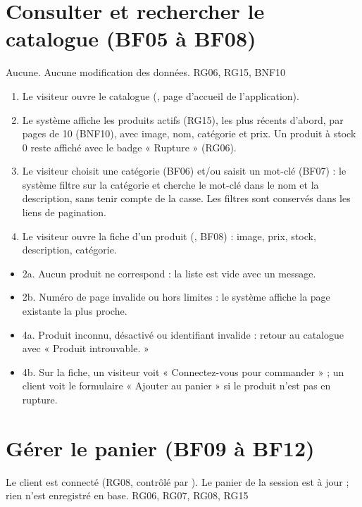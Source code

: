 \section{Consulter et rechercher le catalogue (BF05 à BF08)}

  {Aucune.}
  {Aucune modification des données.}
  {RG06, RG15, BNF10}

\begin{enumerate}
  \item Le visiteur ouvre le catalogue (, page d'accueil de l'application).
  \item Le système affiche les produits actifs (RG15), les plus récents d'abord, par pages de 10 (BNF10), avec
        image, nom, catégorie et prix. Un produit à stock 0 reste affiché avec le badge « Rupture » (RG06).
  \item Le visiteur choisit une catégorie (BF06) et/ou saisit un mot-clé (BF07) : le système filtre sur la
        catégorie et cherche le mot-clé dans le nom et la description, sans tenir compte de la casse. Les filtres
        sont conservés dans les liens de pagination.
  \item Le visiteur ouvre la fiche d'un produit (, BF08) : image, prix, stock, description,
        catégorie.
\end{enumerate}

\begin{itemize}
  \item 2a. Aucun produit ne correspond : la liste est vide avec un message.
  \item 2b. Numéro de page invalide ou hors limites : le système affiche la page existante la plus proche.
  \item 4a. Produit inconnu, désactivé ou identifiant invalide : retour au catalogue avec « Produit introuvable. »
  \item 4b. Sur la fiche, un visiteur voit « Connectez-vous pour commander » ; un client voit le formulaire
        « Ajouter au panier » si le produit n'est pas en rupture.
\end{itemize}

\section{Gérer le panier (BF09 à BF12)}

  {Le client est connecté (RG08, contrôlé par ).}
  {Le panier de la session est à jour ; rien n'est enregistré en base.}
  {RG06, RG07, RG08, RG15}

